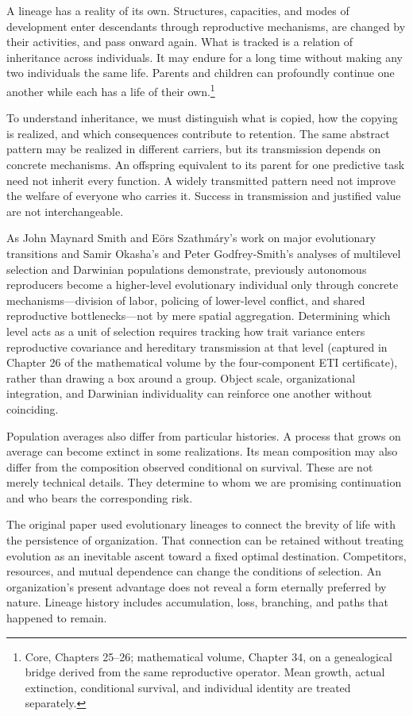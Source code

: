 \documentclass[
  english,
  11pt,
  oneside]{book}
\begin{document}
A lineage has a reality of its own. Structures, capacities, and modes of development enter descendants through reproductive mechanisms, are changed by their activities, and pass onward again. What is tracked is a relation of inheritance across individuals. It may endure for a long time without making any two individuals the same life. Parents and children can profoundly continue one another while each has a life of their own.\footnote{\hypertarget{ph-note-45}{}Core, Chapters 25--26; mathematical volume, Chapter 34, on a genealogical bridge derived from the same reproductive operator. Mean growth, actual extinction, conditional survival, and individual identity are treated separately.}

To understand inheritance, we must distinguish what is copied, how the copying is realized, and which consequences contribute to retention. The same abstract pattern may be realized in different carriers, but its transmission depends on concrete mechanisms. An offspring equivalent to its parent for one predictive task need not inherit every function. A widely transmitted pattern need not improve the welfare of everyone who carries it. Success in transmission and justified value are not interchangeable.

As John Maynard Smith and Eörs Szathmáry's work on major evolutionary transitions and Samir Okasha's and Peter Godfrey-Smith's analyses of multilevel selection and Darwinian populations demonstrate, previously autonomous reproducers become a higher-level evolutionary individual only through concrete mechanisms---division of labor, policing of lower-level conflict, and shared reproductive bottlenecks---not by mere spatial aggregation. Determining which level acts as a unit of selection requires tracking how trait variance enters reproductive covariance and hereditary transmission at that level (captured in Chapter 26 of the mathematical volume by the four-component ETI certificate), rather than drawing a box around a group. Object scale, organizational integration, and Darwinian individuality can reinforce one another without coinciding.

Population averages also differ from particular histories. A process that grows on average can become extinct in some realizations. Its mean composition may also differ from the composition observed conditional on survival. These are not merely technical details. They determine to whom we are promising continuation and who bears the corresponding risk.

The original paper used evolutionary lineages to connect the brevity of life with the persistence of organization. That connection can be retained without treating evolution as an inevitable ascent toward a fixed optimal destination. Competitors, resources, and mutual dependence can change the conditions of selection. An organization's present advantage does not reveal a form eternally preferred by nature. Lineage history includes accumulation, loss, branching, and paths that happened to remain.
\end{document}
